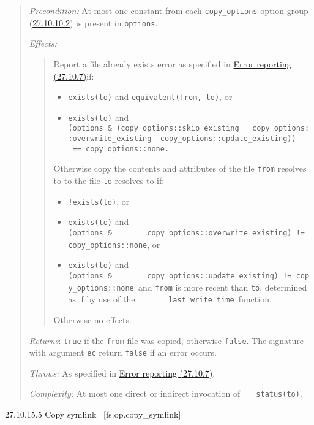 \begin{quote}
\emph{Precondition:} At most one constant from each
\texttt{copy\_options} option group
(\hyperref[enum.copyux5foptions]{27.10.10.2}) is present in
\texttt{options}.

\emph{Effects:}

\begin{quote}
Report a file already exists error as specified in
\hyperref[Error-reporting]{Error reporting (27.10.7)}if:

\begin{itemize}
\tightlist
\item
  \texttt{exists(to)} and \texttt{equivalent(from,\ to)}, or
\item
  \texttt{exists(to)} and
  \texttt{(options\ \&\ (copy\_options::skip\_existing\ ~\textbar{}\ copy\_options::overwrite\_existing\ \textbar{}\ copy\_options::update\_existing))\ ~~\ ==\ copy\_options::none.\ }
\end{itemize}

Otherwise copy the contents and attributes of the file \texttt{from}
resolves to to the file \texttt{to} resolves to if:

\begin{itemize}
\tightlist
\item
  \texttt{!exists(to)}, or
\item
  \texttt{exists(to)} and
  \texttt{(options\ \&\ \ \ \ \ \ \ \ copy\_options::overwrite\_existing)\ !=\ copy\_options::none},
  or
\item
  \texttt{exists(to)} and
  \texttt{(options\ \&\ \ \ \ \ \ \ \ copy\_options::update\_existing)\ !=\ copy\_options::none\ }and
  \texttt{from} is more recent than \texttt{to}, determined as if by use
  of the \texttt{\ \ \ \ \ \ \ last\_write\_time\ }function.
\end{itemize}

Otherwise no effects.
\end{quote}

\emph{Returns}: \texttt{true} if the \texttt{from} file was copied,
otherwise \texttt{false}. The signature with argument \texttt{ec} return
\texttt{false} if an error occurs.

\emph{Throws:} As specified in \hyperref[Error-reporting]{Error
reporting (27.10.7)}.

\emph{Complexity:} At most one direct or indirect invocation of
\texttt{\ \ \ status(to)}.
\end{quote}

27.10.15.5 Copy symlink~ {[}fs.op.copy\_symlink{]}

